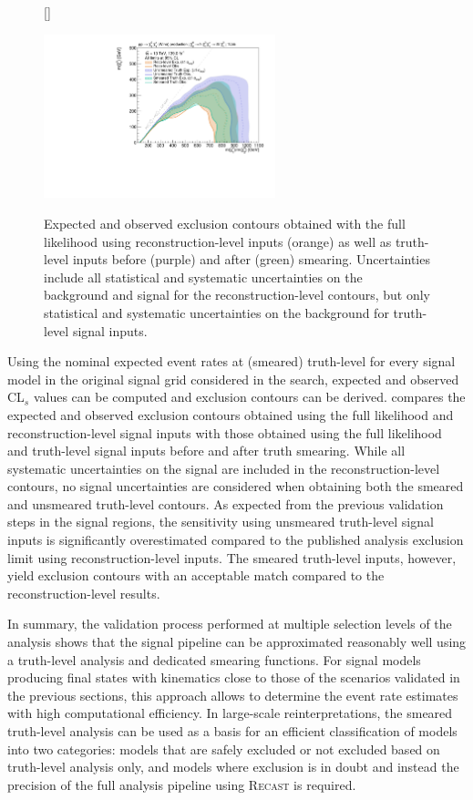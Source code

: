 \begin{figure}
[\FBwidth]
{\caption{Expected and observed exclusion contours obtained with the full likelihood using reconstruction-level inputs (orange) as well as truth-level inputs before (purple) and after (green) smearing. Uncertainties include all statistical and systematic uncertainties on the background and signal for the reconstruction-level contours, but only statistical and systematic uncertainties on the background for truth-level signal inputs.}\label{fig:smearing_signal_regions}}
{\includegraphics[width=0.60\textwidth]{exclusion_1Lbb_truthInput_compareReco_BkgOnly_noLabel}}
\end{figure}

Using the nominal expected event rates at (smeared) truth-level for every signal model in the original signal grid considered in the \onelepton search, expected and observed CL$_s$ values can be computed and exclusion contours can be derived.
 compares the expected and observed exclusion contours obtained using the full likelihood and reconstruction-level signal inputs with those obtained using the full likelihood and truth-level signal inputs before and after truth smearing.
While all systematic uncertainties on the signal are included in the reconstruction-level contours, no signal uncertainties are considered when obtaining both the smeared and unsmeared truth-level contours.
As expected from the previous validation steps in the signal regions, the sensitivity using unsmeared truth-level signal inputs is significantly overestimated compared to the published analysis exclusion limit using reconstruction-level inputs.
The smeared truth-level inputs, however, yield exclusion contours with an acceptable match compared to the reconstruction-level results.

In summary, the validation process performed at multiple selection levels of the analysis shows that the signal pipeline can be approximated reasonably well using a truth-level analysis and dedicated smearing functions.
For signal models producing final states with kinematics close to those of the scenarios validated in the previous sections, this approach allows to determine the event rate estimates with high computational efficiency.
In large-scale reinterpretations, the smeared truth-level analysis can be used as a basis for an efficient classification of models into two categories: models that are safely excluded or not excluded based on truth-level analysis only, and models where exclusion is in doubt and instead the precision of the full analysis pipeline using \textsc{Recast} is required.


